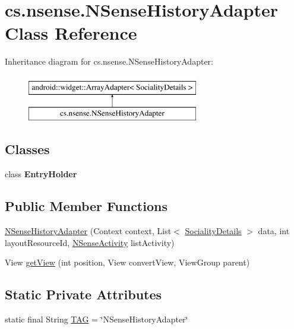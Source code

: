 \hypertarget{classcs_1_1nsense_1_1_n_sense_history_adapter}{\section{cs.\-nsense.\-N\-Sense\-History\-Adapter Class Reference}
\label{classcs_1_1nsense_1_1_n_sense_history_adapter}
}
Inheritance diagram for cs.\-nsense.\-N\-Sense\-History\-Adapter\-:\begin{figure}[H]
\begin{center}
\leavevmode
\includegraphics[height=2.000000cm]{classcs_1_1nsense_1_1_n_sense_history_adapter}
\end{center}
\end{figure}
\subsection*{Classes}
\begin{DoxyCompactItemize}
\item 
class {\bfseries Entry\-Holder}
\end{DoxyCompactItemize}
\subsection*{Public Member Functions}
\begin{DoxyCompactItemize}
\item 
\hyperlink{classcs_1_1nsense_1_1_n_sense_history_adapter_ab61e0f6074774986680a4472e8716238}{N\-Sense\-History\-Adapter} (Context context, List$<$ \hyperlink{classcs_1_1nsense_1_1inference_module_1_1_sociality_details}{Sociality\-Details} $>$ data, int layout\-Resource\-Id, \hyperlink{classcs_1_1nsense_1_1_n_sense_activity}{N\-Sense\-Activity} list\-Activity)
\item 
View \hyperlink{classcs_1_1nsense_1_1_n_sense_history_adapter_ab8c6402d1d11c43f78b4091ce42f3feb}{get\-View} (int position, View convert\-View, View\-Group parent)
\end{DoxyCompactItemize}
\subsection*{Static Private Attributes}
\begin{DoxyCompactItemize}
\item 
static final String \hyperlink{classcs_1_1nsense_1_1_n_sense_history_adapter_a2d9f5a7d40983bad4788d0df8e0a05f1}{T\-A\-G} = \char`\"{}N\-Sense\-History\-Adapter\char`\"{}
\end{DoxyCompactItemize}


